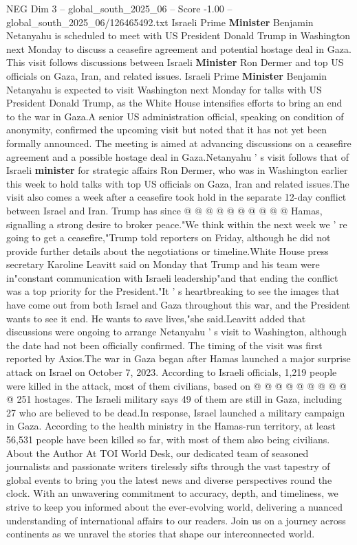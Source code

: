 \begin{textsample}{NEG Dim 3 – global\_south\_2025\_06 – Score -1.00 – global\_south\_2025\_06/126465492.txt}  \label{ex:f3_neg_265}
Israeli Prime \textbf{Minister} Benjamin Netanyahu is scheduled to meet with US President Donald Trump in Washington next Monday to discuss a ceasefire agreement and potential hostage deal in Gaza.
This visit follows discussions between Israeli \textbf{Minister} Ron Dermer and top US officials on Gaza, Iran, and related issues.
Israeli Prime \textbf{Minister} Benjamin Netanyahu is expected to visit Washington next Monday for talks with US President Donald Trump, as the White House intensifies efforts to bring an end to the war in Gaza.A senior US administration official, speaking on condition of anonymity, confirmed the upcoming visit but noted that it has not yet been formally announced.
The meeting is aimed at advancing discussions on a ceasefire agreement and a possible hostage deal in Gaza.Netanyahu ' s visit follows that of Israeli \textbf{minister} for strategic affairs Ron Dermer, who was in Washington earlier this week to hold talks with top US officials on Gaza, Iran and related issues.The visit also comes a week after a ceasefire took hold in the separate 12-day conflict between Israel and Iran.
Trump has since @ @ @ @ @ @ @ @ @ @ Hamas, signalling a strong desire to broker peace."We think within the next week we ' re going to get a ceasefire,"Trump told reporters on Friday, although he did not provide further details about the negotiations or timeline.White House press secretary Karoline Leavitt said on Monday that Trump and his team were in"constant communication with Israeli leadership"and that ending the conflict was a top priority for the President."It ' s heartbreaking to see the images that have come out from both Israel and Gaza throughout this war, and the President wants to see it end.
He wants to save lives,"she said.Leavitt added that discussions were ongoing to arrange Netanyahu ' s visit to Washington, although the date had not been officially confirmed.
The timing of the visit was first reported by Axios.The war in Gaza began after Hamas launched a major surprise attack on Israel on October 7, 2023.
According to Israeli officials, 1,219 people were killed in the attack, most of them civilians, based on @ @ @ @ @ @ @ @ @ @ 251 hostages.
The Israeli military says 49 of them are still in Gaza, including 27 who are believed to be dead.In response, Israel launched a military campaign in Gaza.
According to the health ministry in the Hamas-run territory, at least 56,531 people have been killed so far, with most of them also being civilians.
About the Author At TOI World Desk, our dedicated team of seasoned journalists and passionate writers tirelessly sifts through the vast tapestry of global events to bring you the latest news and diverse perspectives round the clock.
With an unwavering commitment to accuracy, depth, and timeliness, we strive to keep you informed about the ever-evolving world, delivering a nuanced understanding of international affairs to our readers.
Join us on a journey across continents as we unravel the stories that shape our interconnected world.

\end{textsample}
